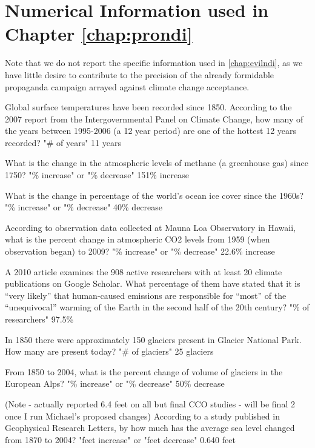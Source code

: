 \chapter{Numerical Information used in Chapter \ref{chap:prondi}}

Note that we do not report the specific information used in \ref{chap:evilndi},
as we have little desire to contribute to the precision of the already
formidable propaganda campaign arrayed against climate change acceptance.


Global surface temperatures have been recorded since 1850. According to the 2007 report from the Intergovernmental Panel on Climate Change, how many of the years between 1995-2006 (a 12 year period) are one of the hottest 12 years recorded?
"\# of years"
11 years

What is the change in the atmospheric levels of methane (a greenhouse gas) since 1750?
"\% increase" or "\% decrease"
151\% increase

What is the change in percentage of the world's ocean ice cover since the 1960s?
"\% increase" or "\% decrease"
40\% decrease

According to observation data collected at Mauna Loa Observatory in Hawaii, what is the percent change in atmospheric CO2 levels from 1959 (when observation began) to 2009?
"\% increase" or "\% decrease"
22.6\% increase

A 2010 article examines the 908 active researchers with at least 20 climate publications on Google Scholar. What percentage of them have stated that it is “very likely” that human-caused emissions are responsible for “most” of the “unequivocal” warming of the Earth in the second half of the 20th century?
"\% of researchers"
97.5\%

In 1850 there were approximately 150 glaciers present in Glacier National Park. How many are present today?
"\# of glaciers"
25 glaciers

From 1850 to 2004, what is the percent change of volume of glaciers in the European Alps?
"\% increase" or "\% decrease"
50\% decrease

(Note - actually reported 6.4 feet on all but final CCO studies - will be final
2 once I run Michael's proposed changes)
According to a study published in Geophysical Research Letters, by how much has the average sea level changed from 1870 to 2004?
"feet increase" or "feet decrease"
0.640 feet

